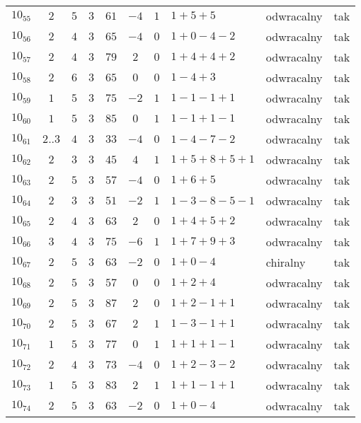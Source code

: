 \begin{longtable}{lccccccllc}
$10_{55}$  & $2$   & $5$ & $3$ & $61$  & $-4$ & $1$ & $1+5+5$       & odwracalny & tak \\
$10_{56}$  & $2$   & $4$ & $3$ & $65$  & $-4$ & $0$ & $1+0-4-2$     & odwracalny & tak \\
$10_{57}$  & $2$   & $4$ & $3$ & $79$  & $2$  & $0$ & $1+4+4+2$     & odwracalny & tak \\
$10_{58}$  & $2$   & $6$ & $3$ & $65$  & $0$  & $0$ & $1-4+3$       & odwracalny & tak \\
$10_{59}$  & $1$   & $5$ & $3$ & $75$  & $-2$ & $1$ & $1-1-1+1$     & odwracalny & tak \\
$10_{60}$  & $1$   & $5$ & $3$ & $85$  & $0$  & $1$ & $1-1+1-1$     & odwracalny & tak \\
$10_{61}$  & $2..3$ & $4$ & $3$ & $33$  & $-4$ & $0$ & $1-4-7-2$     & odwracalny & tak \\
$10_{62}$  & $2$   & $3$ & $3$ & $45$  & $4$  & $1$ & $1+5+8+5+1$   & odwracalny & tak \\
$10_{63}$  & $2$   & $5$ & $3$ & $57$  & $-4$ & $0$ & $1+6+5$       & odwracalny & tak \\
$10_{64}$  & $2$   & $3$ & $3$ & $51$  & $-2$ & $1$ & $1-3-8-5-1$   & odwracalny & tak \\
$10_{65}$  & $2$   & $4$ & $3$ & $63$  & $2$  & $0$ & $1+4+5+2$     & odwracalny & tak \\
$10_{66}$  & $3$   & $4$ & $3$ & $75$  & $-6$ & $1$ & $1+7+9+3$     & odwracalny & tak \\
$10_{67}$  & $2$   & $5$ & $3$ & $63$  & $-2$ & $0$ & $1+0-4$       & chiralny   & tak \\
$10_{68}$  & $2$   & $5$ & $3$ & $57$  & $0$  & $0$ & $1+2+4$       & odwracalny & tak \\
$10_{69}$  & $2$   & $5$ & $3$ & $87$  & $2$  & $0$ & $1+2-1+1$     & odwracalny & tak \\
$10_{70}$  & $2$   & $5$ & $3$ & $67$  & $2$  & $1$ & $1-3-1+1$     & odwracalny & tak \\
$10_{71}$  & $1$   & $5$ & $3$ & $77$  & $0$  & $1$ & $1+1+1-1$     & odwracalny & tak \\
$10_{72}$  & $2$   & $4$ & $3$ & $73$  & $-4$ & $0$ & $1+2-3-2$     & odwracalny & tak \\
$10_{73}$  & $1$   & $5$ & $3$ & $83$  & $2$  & $1$ & $1+1-1+1$     & odwracalny & tak \\
$10_{74}$  & $2$   & $5$ & $3$ & $63$  & $-2$ & $0$ & $1+0-4$       & odwracalny & tak \\

\end{longtable}
